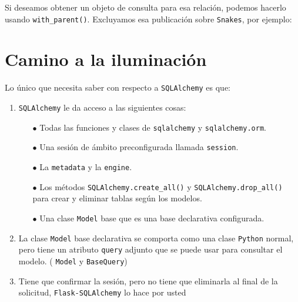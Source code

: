 \documentclass[10pt,letterpaper,notumble]{leaflet}
\begin{document}
{\begin{minipage}{2.2\linewidth}
                
                
                Si deseamos obtener un objeto de consulta para esa relación, podemos hacerlo usando \texttt{with\_parent()}. Excluyamos esa publicación sobre \texttt{Snakes}, por ejemplo:
                
                
            
        \end{minipage}
    
    }
    \clearpage %
    \mbox{}
    \clearpage
    
    \section{Camino a la iluminación}
    
    Lo único que necesita saber con respecto a \texttt{SQLAlchemy} es que:
    
    \begin{enumerate}
    	\item \texttt{SQLAlchemy} le da acceso a las siguientes cosas:
    	
    	    \begin{itemize}
    	    	\item[$\bullet$] Todas las funciones y clases de \texttt{sqlalchemy} y \texttt{sqlalchemy.orm}.
    	    	
    	    	\item[$\bullet$] Una sesión de ámbito preconfigurada llamada \texttt{session}.
    	    	
    	    	\item[$\bullet$] La \texttt{metadata} y la \texttt{engine}.
    	    	
    	    	\item[$\bullet$] Los métodos \texttt{SQLAlchemy.create\_all()} y \texttt{SQLAlchemy.drop\_all()} para crear y eliminar tablas según los modelos.
    	    	
    	    	\item[$\bullet$] Una clase \texttt{Model} base que es una base declarativa configurada.
    	    \end{itemize}
    	
    	\item La clase \texttt{Model} base declarativa se comporta como una clase \texttt{Python} normal, pero tiene un atributo \texttt{query} adjunto que se puede usar para consultar el modelo. ( \texttt{Model} y \texttt{BaseQuery})
    	
    	\item Tiene que confirmar la sesión, pero no tiene que eliminarla al final de la solicitud, \texttt{Flask-SQLAlchemy} lo hace por usted
    \end{enumerate}
    
\end{document}
